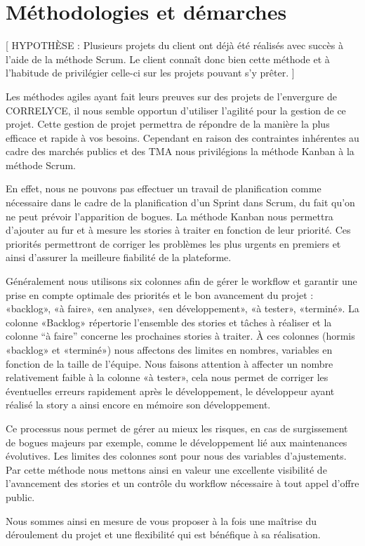 \section{Méthodologies et démarches}
[ HYPOTHÈSE : Plusieurs projets du client ont déjà été réalisés avec succès à l’aide de la méthode Scrum. Le client connaît donc bien cette méthode et à l’habitude de privilégier celle-ci sur les projets pouvant s’y prêter. ]

Les méthodes agiles ayant fait leurs preuves sur des projets de l’envergure de CORRELYCE, il nous semble opportun d’utiliser l’agilité pour la gestion de ce projet. Cette gestion de projet permettra de répondre de la manière la plus efficace et rapide à vos besoins. Cependant en raison des contraintes inhérentes au cadre des marchés publics et des TMA nous privilégions la méthode Kanban à la méthode Scrum. 

En effet, nous ne pouvons pas effectuer un travail de planification comme nécessaire dans le cadre de la planification d’un Sprint dans Scrum, du fait qu’on ne peut prévoir l’apparition de bogues. La méthode Kanban nous permettra d’ajouter au fur et à mesure les stories à traiter en fonction de leur priorité. Ces priorités permettront de corriger les problèmes les plus urgents en premiers et ainsi d’assurer la meilleure fiabilité de la plateforme.

Généralement nous utilisons six colonnes afin de gérer le workflow et garantir une prise en compte optimale des priorités et le bon avancement du projet : «backlog», «à faire», «en analyse», «en développement», «à tester», «terminé». 
La colonne «Backlog» répertorie l’ensemble des stories et tâches à réaliser et la colonne “à faire” concerne les prochaines stories à traiter. 
À ces colonnes (hormis «backlog» et «terminé») nous affectons des limites en nombres, variables en fonction de la taille de l’équipe. Nous faisons attention à affecter un nombre relativement faible à la colonne «à tester», cela nous permet de corriger les éventuelles erreurs rapidement après le développement, le développeur ayant réalisé la story a ainsi encore en mémoire son développement. 

Ce processus nous permet de gérer au mieux les risques, en cas de surgissement de bogues majeurs par exemple, comme le développement lié aux maintenances évolutives. Les limites des colonnes sont pour nous des variables d’ajustements. Par cette méthode nous mettons ainsi en valeur une excellente visibilité de l’avancement des stories et un contrôle du workflow nécessaire à tout appel d’offre public. 

Nous sommes ainsi en mesure de vous proposer à la fois une maîtrise du déroulement du projet et une flexibilité qui est bénéfique à sa réalisation. 

